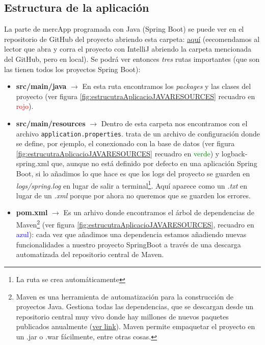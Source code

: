 \documentclass[a4paper,12pt]{report}
\begin{document}
				\subsection{Estructura de la aplicación}
				\label{sec:estructuraAplicacion}
				
				La parte de mercApp programada con Java (Spring Boot) se puede ver en el repositorio de GitHub del proyecto abriendo esta carpeta: \href{https://github.com/blackcub3s/mercApp/tree/main/APP%20WEB/__springboot__produccio__/app}{aquí} (eecomendamos al lector que abra y corra el proyecto con IntelliJ abriendo la carpeta mencionada del GitHub, pero en local). Se podrá ver entonces \textit{tres} rutas importantes (que son las tienen todos los proyectos Spring Boot):
				
				\vspace{-.9em}
				\begin{itemize}
					\setlength{\itemsep}{-.5em}
					\item \textbf{src/main/java} $\rightarrow$ En esta ruta encontramos los \textit{packages} y las clases del proyecto (ver figura \ref{fig:estrucutraAplicacioJAVARESOURCES} recuadro en \textcolor{red}{rojo}).
					\item \textbf{src/main/resources} $\rightarrow$ Dentro de esta carpeta  nos encontramos con el archivo \texttt{application.properties}. trata de un archivo de configuración donde se define, por ejemplo, el conexionado con la base de datos (ver figura \ref{fig:estrucutraAplicacioJAVARESOURCES} recuadro en \textcolor{green}{verde}) y logback-spring.xml que, aunque no está definido por defecto en una aplicación Spring Boot, si lo añadimos lo que hace es que los logs del proyecto se guarden en \textit{logs/spring.log} en lugar de salir a terminal\footnote{La ruta se crea automáticamente}. Aquí aparece como un \textit{.txt} en lugar de un \textit{.xml} porque por ahora no queremos que se guarden los errores.
					\item \textbf{pom.xml} $\rightarrow$ Es un arhivo donde encontramos el árbol de dependencias de Maven\footnote{Maven es una herramienta de automatización para la construcción de proyectos Java. Gestiona todas las dependencias, que se descargan desde un repositorio central muy vivo donde hay millones de nuevos paquetes publicados anualmente (\href{https://mvnrepository.com/repos/central}{ver link}). Maven permite empaquetar el proyecto en un .jar o .war fácilmente, entre otras cosas.} (ver figura \ref{fig:estrucutraAplicacioJAVARESOURCES}, recuadro en \textcolor{blue}{azul}): cada vez que añadimos una dependencia estamos añadiendo nuevas funcionalidades a nuestro proyecto SpringBoot a través de una descarga automatizada del repositorio central de Maven.
					
					
				\end{itemize}
				
\end{document}
